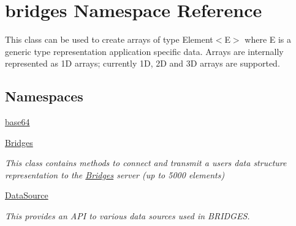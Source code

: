 \hypertarget{namespacebridges}{}\section{bridges Namespace Reference}
\label{namespacebridges}


This class can be used to create arrays of type Element$<$\+E$>$ where E is a generic type representation application specific data. Arrays are internally represented as 1\+D arrays; currently 1\+D, 2\+D and 3\+D arrays are supported.  


\subsection*{Namespaces}
\begin{DoxyCompactItemize}
\item 
 \hyperlink{namespacebridges_1_1base64}{base64}
\item 
 \hyperlink{namespacebridges_1_1_bridges}{Bridges}
\begin{DoxyCompactList}\small\item\em This class contains methods to connect and transmit a user\textquotesingle{}s data structure representation to the \hyperlink{namespacebridges_1_1_bridges}{Bridges} server (up to 5000 elements) \end{DoxyCompactList}\item 
 \hyperlink{namespacebridges_1_1_data_source}{Data\+Source}
\begin{DoxyCompactList}\small\item\em This provides an A\+P\+I to various data sources used in B\+R\+I\+D\+G\+E\+S. \end{DoxyCompactList}\end{DoxyCompactItemize}
